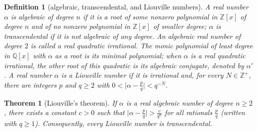 \documentclass[11pt]{article}
\theoremstyle{ntstyle}
\newtheorem{theorem}{Theorem}[subsection]
\newtheorem{definition}{Definition}[subsection]
\begin{document}
\begin{definition}[algebraic, transcendental, and Liouville numbers]\label{def:10.1.1}\label{def:algebraic-transcendental-and-liouville-numbers}
  A real number $\alpha$ is algebraic of degree $n$ if it is a root of some
  nonzero polynomial in $\mathbb{Z}[x]$ of degree $n$ and of no nonzero
  polynomial in $\mathbb{Z}[x]$ of smaller degree; $\alpha$ is transcendental
  if it is not algebraic of any degree. An algebraic real number of degree $2$
  is called a real quadratic irrational. The monic polynomial of least degree
  in $\mathbb{Q}[x]$ with $\alpha$ as a root is its minimal polynomial; when
  $\alpha$ is a real quadratic irrational, the other
  root of this quadratic is its algebraic conjugate, denoted by $\alpha'$.
  A real number $\alpha$ is a Liouville
  number if it is irrational and, for every $N\in\mathbb{Z}^+$, there are
  integers $p$ and $q\ge2$ with
  $0<\bigl|\alpha-\tfrac{p}{q}\bigr|<q^{-N}$.

\end{definition}

\begin{theorem}[Liouville's theorem]\label{thm:10.1.3}\label{thm:liouville-theorem}
  If $\alpha$ is a real
  algebraic number of degree $n\ge2$, there exists a constant $c>0$ such that
  $\big|\alpha - \tfrac{p}{q}\big| > \tfrac{c}{q^{n}}$ for all rationals $\tfrac{p}{q}$ (written with $q \ge 1$).
  Consequently, every Liouville number is transcendental.

\end{theorem}
\end{document}
